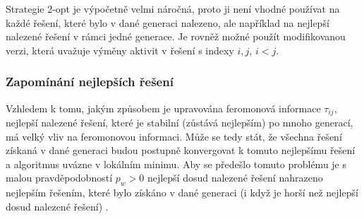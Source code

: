 \documentclass[a4paper,12pt]{article}
\begin{document}
Strategie 2-opt je výpočetně velmi náročná, proto ji není vhodné používat na každé řešení, které
bylo v dané generaci nalezeno, ale například na nejlepší nalezené řešení v rámci jedné generace.
Je rovněž možné použít modifikovanou verzi, která
uvažuje výměny aktivit v řešení s indexy $i,j$, $i < j$.

\subsubsection{Zapomínání nejlepších řešení}
Vzhledem k tomu, jakým způsobem je upravována feromonová informace $\tau_{ij}$, nejlepší
nalezené řešení, které je stabilní (zůstává nejlepším) po mnoho generací, má 
velký vliv na feromonovou informaci. Může se tedy stát, že všechna řešení získaná v 
dané generaci budou postupně konvergovat k tomuto nejlepšímu řešení a algoritmus
uvázne v lokálním minimu. Aby se předešlo tomuto problému je s malou pravděpodobností
$p_w > 0$ nejlepší dosud nalezené řešení nahrazeno nejlepším řešením, které bylo 
získáno v dané generaci (i když je horší než nejlepší dosud nalezené řešení) \cite{Merkle00antcolony, 1027745}.
\end{document}
